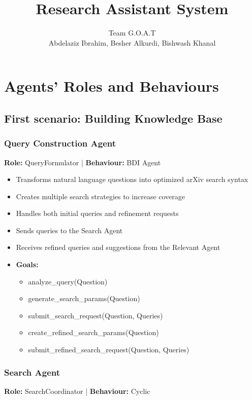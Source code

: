 \documentclass{article}
\title{Research Assistant System}
\author{Team G.O.A.T\\
Abdelaziz Ibrahim, Besher Alkurdi, Bishwash Khanal}
\date{}
\begin{document}
\maketitle

\section{Agents' Roles and Behaviours}
\subsection{First scenario: Building Knowledge Base}

\subsubsection{Query Construction Agent}

\textbf{Role:} QueryFormulator | \textbf{Behaviour:} BDI Agent

\begin{itemize}
  \item Transforms natural language questions into optimized arXiv search syntax
  \item Creates multiple search strategies to increase coverage
  \item Handles both initial queries and refinement requests
  \item Sends queries to the Search Agent
  \item Receives refined queries and suggestions from the Relevant Agent
  \item \textbf{Goals:} \begin{itemize} 
    \item analyze\_query(Question)
    \item generate\_search\_params(Question)
    \item submit\_search\_request(Question, Queries)
    \item create\_refined\_search\_params(Question)
    \item submit\_refined\_search\_request(Question, Queries)
  \end{itemize}
\end{itemize}

\subsubsection{Search Agent}

\textbf{Role:} SearchCoordinator | \textbf{Behaviour:} Cyclic
\end{document}
